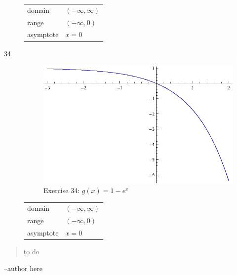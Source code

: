 \documentclass{exam}
\begin{document}
\begin{description}
      \begin{tabular}[H]{ll}
        \toprule
        domain    & $(-\infty, \infty)$ \\
        range     & $(-\infty, 0)$ \\
        asymptote & $x = 0$ \\
        \bottomrule
      \end{tabular}

    \item[34] 
      \begin{figure}[H]
        \centering
        \includegraphics[scale=1.0]{exercise34.eps}
        \caption*{Exercise 34: $g(x) = 1 - e^x$}
      \end{figure}

      \begin{tabular}[H]{ll}
        \toprule
        domain    & $(-\infty, \infty)$ \\
        range     & $(-\infty, 0)$ \\
        asymptote & $x = 0$ \\
        \bottomrule
      \end{tabular}

  \end{description}

\else
  \vspace{6 cm}
  \begin{quote}
    \begin{em}
      to do
    \end{em}
  \end{quote}

  \hspace{1 cm} --author here


\fi
\end{document}
